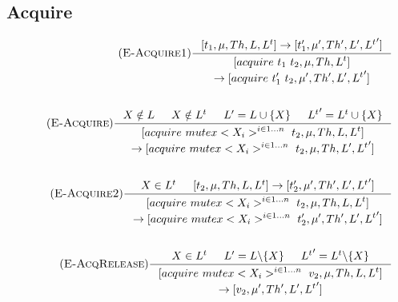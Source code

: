 \documentclass[12pt]{article}
\begin{document}
\subsection{Acquire}
\begin{align*}
    \tag{\textsc{E-Acquire1}}
    \inference[]{[t_1,\mu,Th,L,L^t]->[t_1',\mu',Th', L',{L^t}']}
    {\begin{gathered}[acquire~t_1~t_2,\mu,Th,L^t] \\-> [acquire~t_1'~t_2,\mu',Th',L',{L^t}']\end{gathered}}
    \\
    \\
    \tag{\textsc{E-Acquire}}
    \inference[]{X\notin L & X\notin L^t & L' =L\cup\{X\} & {L^t}'=L^t\cup\{X\}}
    {\begin{gathered}[acquire~mutex<X_i>^{i\in 1...n}~t_2,\mu,Th,L,L^t]\\->[acquire~mutex<X_i>^{i\in 1...n}~t_2,\mu,Th,L',{L^t}']\end{gathered}}
    \\
    \\
    \tag{\textsc{E-Acquire2}}
    \inference[]{X\in L^t & [t_2,\mu,Th,L,L^t]->[t_2',\mu',Th', L',{L^t}']}{\begin{gathered}[acquire~mutex<X_i>^{i\in 1...n}~t_2,\mu,Th,L,L^t]\\->[acquire~mutex<X_i>^{i\in 1...n}~t_2',\mu',Th',L',{L^t}']\end{gathered}}
    \\
    \\
    \tag{\textsc{E-AcqRelease}}
    \inference[]{X\in L^t & L' = L\backslash\{X\} &{L^t}'=L^t \backslash\{X\}}
    {\begin{gathered}[acquire~mutex<X_i>^{i\in 1...n}~v_2,\mu,Th,L,L^t]\\->[v_2,\mu',Th',L',{L^t}']\end{gathered}}
    \end{align*}
\end{document}
